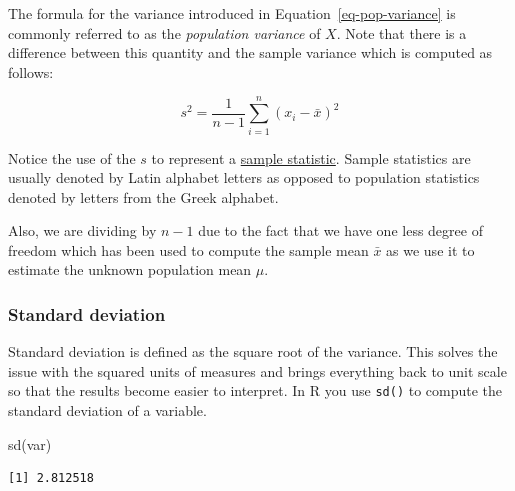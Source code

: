 \documentclass[
  letterpaper,
  DIV=11,
  numbers=noendperiod]{scrartcl}
\newenvironment{Shaded}{\begin{snugshade}}{\end{snugshade}}
\newcommand{\FunctionTok}[1]{\textcolor[rgb]{0.28,0.35,0.67}{#1}}
\newcommand{\NormalTok}[1]{\textcolor[rgb]{0.00,0.23,0.31}{#1}}
\begin{document}
\begin{tcolorbox}[enhanced jigsaw, colbacktitle=quarto-callout-note-color!10!white, coltitle=black, leftrule=.75mm, colback=white, colframe=quarto-callout-note-color-frame, rightrule=.15mm, opacitybacktitle=0.6, titlerule=0mm, arc=.35mm, toptitle=1mm, opacityback=0, bottomtitle=1mm, left=2mm, title=\textcolor{quarto-callout-note-color}{\faInfo}\hspace{0.5em}{Note}, bottomrule=.15mm, breakable, toprule=.15mm]

The formula for the variance introduced in
Equation~\ref{eq-pop-variance} is commonly referred to as the
\emph{population variance} of \(X\). Note that there is a difference
between this quantity and the sample variance which is computed as
follows:

\[
s^2 = \frac{1}{n-1} \sum_{i=1}^n (x_i - \bar{x})^2
\]

Notice the use of the \(s\) to represent a
\href{https://www.sciencedirect.com/topics/mathematics/sample-statistic}{sample
statistic}. Sample statistics are usually denoted by Latin alphabet
letters as opposed to population statistics denoted by letters from the
Greek alphabet.

Also, we are dividing by \(n-1\) due to the fact that we have one less
degree of freedom which has been used to compute the sample mean
\(\bar{x}\) as we use it to estimate the unknown population mean
\(\mu\).

\end{tcolorbox}

\subsubsection{Standard deviation}\label{standard-deviation}

Standard deviation is defined as the square root of the variance. This
solves the issue with the squared units of measures and brings
everything back to unit scale so that the results become easier to
interpret. In R you use \texttt{sd()} to compute the standard deviation
of a variable.

\begin{Shaded}
\begin{Highlighting}[]
\FunctionTok{sd}\NormalTok{(var)}
\end{Highlighting}
\end{Shaded}

\begin{verbatim}
[1] 2.812518
\end{verbatim}
\end{document}
